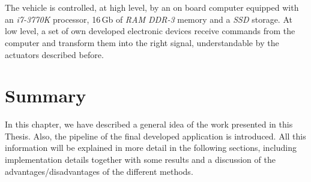 ~\\~\\The vehicle is controlled, at high level, by an on board computer equipped with an \emph{i7-3770K} processor, 16\,Gb of \emph{RAM DDR-3} memory and a \emph{SSD} storage. At low level, a set of own developed electronic devices receive commands from the computer and transform them into the right signal, understandable by the actuators described before.


\section{Summary}\label{ch:chapter00_04}

In this chapter, we have described a general idea of the work presented in this Thesis. Also, the pipeline of the final developed application is introduced. All this information will be explained in more detail in the following sections, including implementation details together with some results and a discussion of the advantages/disadvantages of the different methods.